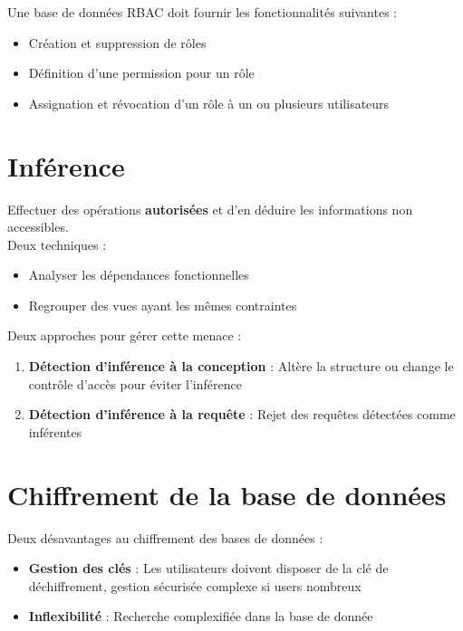 \documentclass{report}
\begin{document}
			Une base de données RBAC doit fournir les fonctionnalités suivantes : \\

			\begin{itemize}
				\item Création et suppression de rôles
				\item Définition d'une permission pour un rôle
				\item Assignation et révocation d'un rôle à un ou plusieurs utilisateurs\\
			\end{itemize}

	\section{Inférence}

		Effectuer des opérations \textbf{autorisées} et d'en déduire les informations non accessibles.\\

		Deux techniques :\\

		\begin{itemize}
			\item Analyser les dépendances fonctionnelles
			\item Regrouper des vues ayant les mêmes contraintes\\
		\end{itemize}

		Deux approches pour gérer cette menace : \\

		\begin{enumerate}
			\item \textbf{Détection d'inférence à la conception} : Altère la structure ou change le contrôle d'accès pour éviter l'inférence
			\item \textbf{Détection d'inférence à la requête} : Rejet des requêtes détectées comme inférentes\\
		\end{enumerate}

	\section{Chiffrement de la base de données}

		Deux désavantages au chiffrement des bases de données : \\

		\begin{itemize}
			\item \textbf{Gestion des clés} : Les utilisateurs doivent disposer de la clé de déchiffrement, gestion sécurisée complexe si users nombreux
			\item \textbf{Inflexibilité} : Recherche complexifiée dans la base de donnée\\
		\end{itemize}
\end{document}
